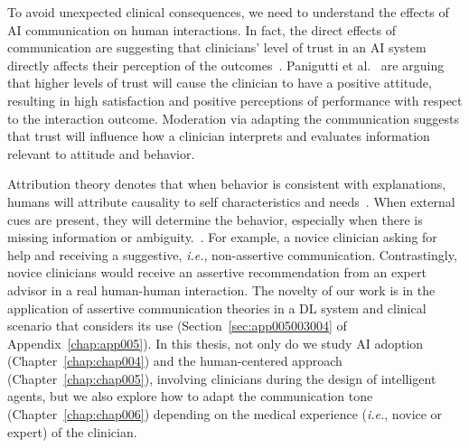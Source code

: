 To avoid unexpected clinical consequences, we need to understand the effects of \ac{AI} communication on human interactions.
In fact, the direct effects of communication are suggesting that clinicians' level of trust in an \ac{AI} system directly affects their perception of the outcomes~\cite{HOHENSTEIN2020106190}.
Panigutti et al.~\cite{10.1145/3491102.3502104} are arguing that higher levels of trust will cause the clinician to have a positive attitude, resulting in high satisfaction and positive perceptions of performance with respect to the interaction outcome.
Moderation via adapting the communication suggests that trust will influence how a clinician interprets and evaluates information relevant to attitude and behavior.

\textcolor{revised}{Attribution theory denotes that when behavior is consistent with explanations, humans will attribute causality to self characteristics and needs~\cite{CALISTO2021102607}.
When external cues are present, they will determine the behavior, especially when there is missing information or ambiguity.~\cite{HOHENSTEIN2020106190}.
For example, a novice clinician asking for help and receiving a suggestive, {\it i.e.}, non-assertive communication.
Contrastingly, novice clinicians would receive an assertive recommendation from an expert advisor in a real human-human interaction.
The novelty of our work is in the application of assertive communication theories in a \ac{DL} system and clinical scenario that considers its use (Section~\ref{sec:app005003004} of Appendix~\ref{chap:app005}).
In this thesis, not only do we study \ac{AI} adoption (Chapter~\ref{chap:chap004}) and the human-centered approach (Chapter~\ref{chap:chap005}), involving clinicians during the design of intelligent agents, but we also explore how to adapt the communication tone (Chapter~\ref{chap:chap006}) depending on the medical experience ({\it i.e.}, novice or expert) of the clinician.}
